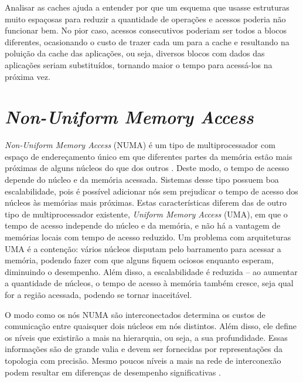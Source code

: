 Analisar as caches ajuda a entender por que um esquema que usasse estruturas muito espaçosas para reduzir a quantidade de operações e acessos poderia não funcionar bem.
No pior caso, acessos consecutivos poderiam ser todos a blocos diferentes, ocasionando o custo de trazer cada um para a cache e resultando na poluição da cache das aplicações, ou seja, diversos blocos com dados das aplicações seriam substituídos, tornando maior o tempo para acessá-los na próxima vez.


\section{\textit{Non-Uniform Memory Access}}
\label{sec:numa}

\textit{Non-Uniform Memory Access} (NUMA) é um tipo de multiprocessador com espaço de endereçamento único em que diferentes partes da memória estão mais próximas de alguns núcleos do que dos outros \cite{Patterson}.
Deste modo, o tempo de acesso depende do núcleo e da memória acessada.
Sistemas desse tipo possuem boa escalabilidade, pois é possível adicionar nós sem prejudicar o tempo de acesso dos núcleos às memórias mais próximas.
Estas características diferem das de outro tipo de multiprocessador existente, \textit{Uniform Memory Access} (UMA), em que o tempo de acesso independe do núcleo e da memória, e não há a vantagem de memórias locais com tempo de acesso reduzido.
Um problema com arquiteturas UMA é a contenção: vários núcleos disputam pelo barramento para acessar a memória, podendo fazer com que alguns fiquem ociosos enquanto esperam, diminuindo o desempenho.
Além disso, a escalabilidade é reduzida -- ao aumentar a quantidade de núcleos, o tempo de acesso à memória também cresce, seja qual for a região acessada, podendo se tornar inaceitável.

O modo como os nós NUMA são interconectados determina os custos de comunicação entre quaisquer dois núcleos em nós distintos.
Além disso, ele define os níveis que existirão a mais na hierarquia, ou seja, a sua profundidade.
Essas informações são de grande valia e devem ser fornecidas por representações da topologia com precisão.
Mesmo poucos níveis a mais na rede de interconexão podem resultar em diferenças de desempenho significativas \cite{MPITopFunc}.



